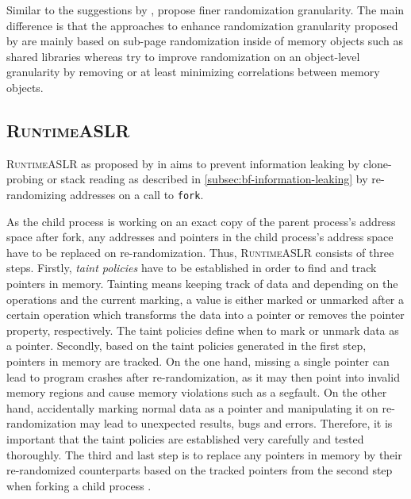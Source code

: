 \bigskip\noindent
Similar to the suggestions by \citeauthor{Shacham2004}, \citeauthor{MarcoGisbert2016} propose finer randomization granularity.
The main difference is that the approaches to enhance randomization granularity proposed by \citeauthor{Shacham2004} are mainly based on sub-page randomization inside of memory objects such as shared libraries whereas \citeauthor{MarcoGisbert2016} try to improve randomization on an object-level granularity by removing or at least minimizing correlations between memory objects.

\subsection{\textsc{RuntimeASLR}}
\label{subsec:runtimeaslr}

\textsc{RuntimeASLR} as proposed by \citeauthor{Lu2016} in \citeyear{Lu2016} aims to prevent information leaking by clone-probing or stack reading as described in \cref{subsec:bf-information-leaking} by re-randomizing addresses on a call to \texttt{fork}.

As the child process is working on an exact copy of the parent process's address space after fork, any addresses and pointers in the child process's address space have to be replaced on re-randomization.
Thus, \textsc{RuntimeASLR} consists of three steps.
Firstly, \emph{taint policies} have to be established in order to find and track pointers in memory.
Tainting means keeping track of data and depending on the operations and the current marking, a value is either marked or unmarked after a certain operation which transforms the data into a pointer or removes the pointer property, respectively.
The taint policies define when to mark or unmark data as a pointer.
Secondly, based on the taint policies generated in the first step, pointers in memory are tracked.
On the one hand, missing a single pointer can lead to program crashes after re-randomization, as it may then point into invalid memory regions and cause memory violations such as a \gls{segfault}.
On the other hand, accidentally marking normal data as a pointer and manipulating it on re-randomization may lead to unexpected results, bugs and errors.
Therefore, it is important that the taint policies are established very carefully and tested thoroughly.
The third and last step is to replace any pointers in memory by their re-randomized counterparts based on the tracked pointers from the second step when forking a child process \cite[3\psq]{Lu2016}.

